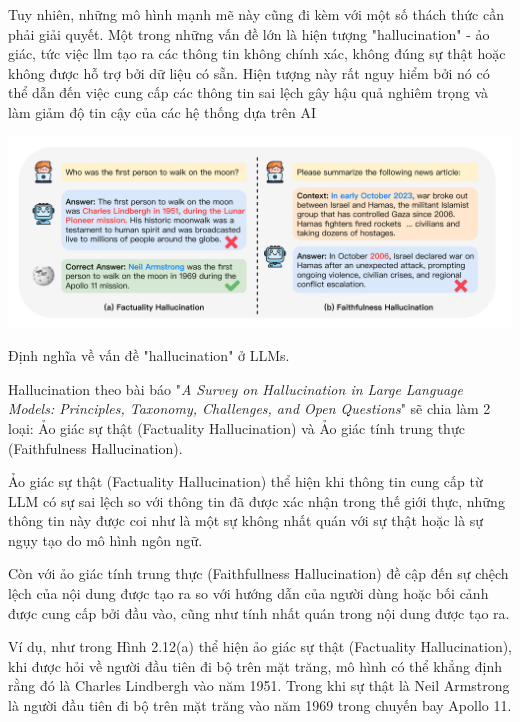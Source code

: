 \documentclass[a4paper, 12pt, openany]{book}
\begin{document}
Tuy nhiên, những mô hình mạnh mẽ này cũng đi kèm với một số thách thức cần phải giải quyết.
Một trong những vấn đề lớn là hiện tượng "hallucination" - ảo giác, tức việc \ac{llm} tạo ra các thông tin không chính xác,
không đúng sự thật hoặc không được hỗ trợ bởi dữ liệu có sẵn. Hiện tượng này rất nguy hiểm bởi nó có thể dẫn đến việc cung cấp các thông tin sai lệch gây hậu quả nghiêm trọng và làm giảm độ tin cậy của các hệ thống dựa trên AI

\begin{minipage}{\linewidth}
    \centering
    \includegraphics[width=14cm]{./assets/images/hallucination.png}
    \captionsetup{type=figure}
    \caption{Định nghĩa về vấn đề "hallucination" ở LLMs.}
\end{minipage}

Hallucination \cite{huang2023survey} theo bài báo "\textit{A Survey on Hallucination in Large Language Models:
Principles, Taxonomy, Challenges, and Open Questions}" sẽ chia làm 2 loại: Ảo giác sự thật (Factuality Hallucination)
và Ảo giác tính trung thực (Faithfulness Hallucination).

Ảo giác sự thật (Factuality Hallucination) thể hiện khi thông tin cung cấp từ LLM có sự sai lệch
so với thông tin đã được xác nhận trong thế giới thực, những thông tin
này được coi như là một sự không nhất quán với sự thật hoặc là sự ngụy tạo do mô hình ngôn ngữ.

Còn với ảo giác tính trung thực (Faithfullness Hallucination) đề cập đến sự chệch lệch của nội dung được tạo ra so với 
hướng dẫn của người dùng hoặc bối cảnh được cung cấp bởi đầu vào, cũng như tính nhất quán trong nội dung được tạo ra.

Ví dụ, như trong Hình 2.12(a) thể hiện ảo giác sự thật (Factuality Hallucination), khi được hỏi về người đầu tiên đi bộ trên mặt trăng, mô hình có thể khẳng định rằng đó là Charles Lindbergh vào năm 1951.
Trong khi sự thật là Neil Armstrong là người đầu tiên đi bộ trên mặt trăng vào năm 1969 trong chuyến bay Apollo 11. 
\end{document}
